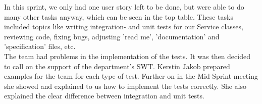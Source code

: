 In this sprint, we only had one user story left to be done, but were able to do many other tasks anyway, which can be seen in the top table. These tasks included topics like writing integration- and unit tests for our Service classes, reviewing code, fixing bugs, adjusting 'read me', 'documentation' and 'specification' files, etc.\\

The team had problems in the implementation of the tests. It was then decided to call on the support of the department's SWT. Kerstin Jakob prepared examples for the team for each type of test. Further on in the Mid-Sprint meeting she showed and explained to us how to implement the tests correctly. She also explained the clear difference between integration and unit tests. 